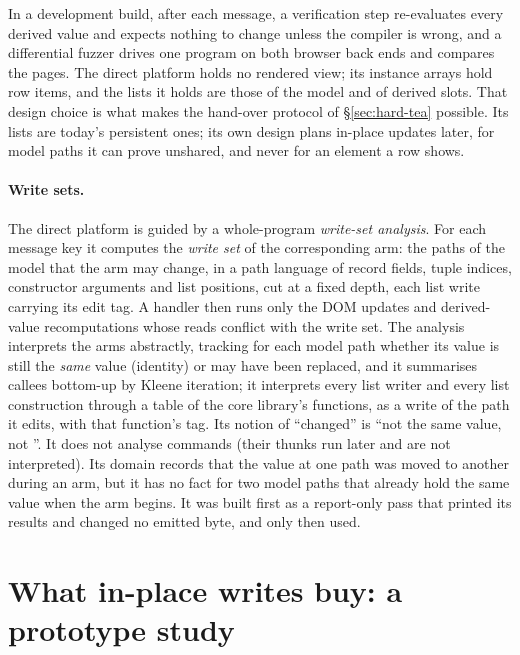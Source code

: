 In a development build, after each message, a verification step re-evaluates every derived value and
expects nothing to change unless the compiler is wrong, and a differential fuzzer drives one program
on both browser back ends and compares the pages. The direct platform holds no rendered view; its
instance arrays hold row items, and the lists it holds are those of the model and of derived slots.
That design choice is what makes the hand-over protocol of \S\ref{sec:hard-tea} possible. Its lists
are today's persistent ones; its own design plans in-place updates later, for model paths it can prove
unshared, and never for an element a row shows.

\paragraph{Write sets.} The direct platform is guided by a whole-program \emph{write-set analysis}.
For each message key it computes the \emph{write set} of the corresponding  arm: the paths
of the model that the arm may change, in a path language of record fields, tuple indices,
constructor arguments and list positions, cut at a fixed depth, each list write carrying its edit tag.
A handler then runs only the DOM updates and derived-value recomputations whose reads conflict with the
write set. The analysis interprets the arms abstractly, tracking for each model path whether its value
is still the \emph{same} value (identity) or may have been replaced, and it summarises callees
bottom-up by Kleene iteration; it interprets every list writer and every list construction through a
table of the core library's functions, as a write of the path it edits, with that function's tag. Its
notion of ``changed'' is ``not the same value, not \code{===}''. It does not analyse commands (their
thunks run later and are not interpreted). Its domain records that the value at one path was moved
to another during an arm, but it has no fact for two model paths that already hold the same value
when the arm begins. It was built first as a report-only pass that printed its results and changed no
emitted byte, and only then used.

\section{What in-place writes buy: a prototype study}
\label{sec:bg-measure}

